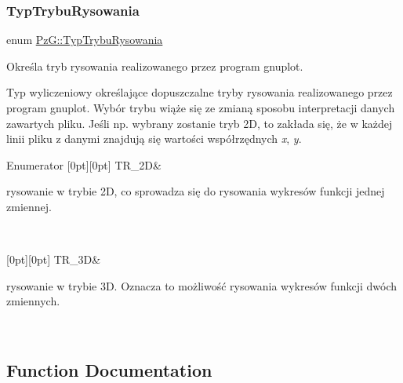 \subsubsection{\texorpdfstring{TypTrybuRysowania}{TypTrybuRysowania}}
{\footnotesize\ttfamily enum \mbox{\hyperlink{namespace_pz_g_aef59d70a0ee2eab473790613c3628944}{Pz\+G\+::\+Typ\+Trybu\+Rysowania}}}



Określa tryb rysowania realizowanego przez program {\ttfamily gnuplot}. 

Typ wyliczeniowy określające dopuszczalne tryby rysowania realizowanego przez program {\ttfamily gnuplot}. Wybór trybu wiąże się ze zmianą sposobu interpretacji danych zawartych pliku. Jeśli np. wybrany zostanie tryb 2D, to zakłada się, że w każdej linii pliku z danymi znajdują się wartości współrzędnych {\itshape x}, {\itshape y}. \begin{DoxyEnumFields}{Enumerator}
[0pt][0pt]{}\mbox{\label{namespace_pz_g_aef59d70a0ee2eab473790613c3628944a5eb0cf8b3405e136f092efdb489d60c4}} 
T\+R\+\_\+2D&
\begin{DoxyItemize}
\item rysowanie w trybie 2D, co sprowadza się do rysowania wykresów funkcji jednej zmiennej. 
\end{DoxyItemize}\\
\hline

[0pt][0pt]{}\mbox{\label{namespace_pz_g_aef59d70a0ee2eab473790613c3628944a856e6b0fa6b8a9dc184c60cf27dcc5d2}} 
T\+R\+\_\+3D&
\begin{DoxyItemize}
\item rysowanie w trybie 3D. Oznacza to możliwość rysowania wykresów funkcji dwóch zmiennych. 
\end{DoxyItemize}\\
\hline

\end{DoxyEnumFields}


\subsection{Function Documentation}
\mbox{\label{namespace_pz_g_ae1aad0c681853d7e47da4cdfccefc102}} 
